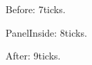 \documentclass{beamer}
\date{}
\newcommand{\unit}{ms}
\begin{document}
\begin{frame}
\renewcommand{\unit}{ticks}Before: 7\unit.\par
\begin{block}{Panel}Inside: 8\unit.\end{block}
After: 9\unit.
\end{frame}
\end{document}
